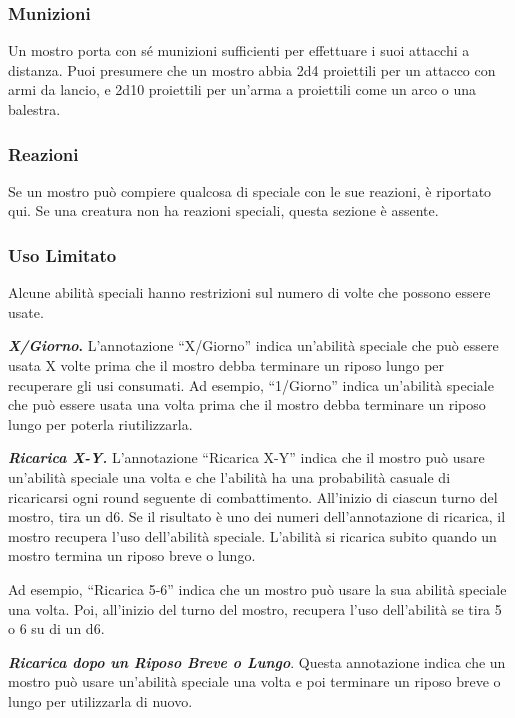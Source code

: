 \begin{multicols}{2}
\subsubsection{Munizioni}

Un mostro porta con sé munizioni sufficienti per effettuare i suoi attacchi a distanza. Puoi presumere che un mostro abbia 2d4 proiettili per un attacco con armi da lancio, e 2d10 proiettili per un'arma a proiettili come un arco o una balestra.

\subsubsection{Reazioni}

Se un mostro può compiere qualcosa di speciale con le sue reazioni, è riportato qui. Se una creatura non ha reazioni speciali, questa sezione è assente.

\subsubsection{Uso Limitato}

Alcune abilità speciali hanno restrizioni sul numero di volte che
possono essere usate.

\textbf{\emph{X/Giorno}.} L'annotazione ``X/Giorno'' indica un'abilità
speciale che può essere usata X volte prima che il mostro debba
terminare un riposo lungo per recuperare gli usi consumati. Ad esempio,
``1/Giorno'' indica un'abilità speciale che può essere usata una volta
prima che il mostro debba terminare un riposo lungo per poterla
riutilizzarla.

\emph{\textbf{Ricarica X-Y.}} L'annotazione ``Ricarica X-Y'' indica che
il mostro può usare un'abilità speciale una volta e che l'abilità ha una
probabilità casuale di ricaricarsi ogni round seguente di combattimento.
All'inizio di ciascun turno del mostro, tira un d6. Se il risultato è
uno dei numeri dell'annotazione di ricarica, il mostro recupera l'uso
dell'abilità speciale. L'abilità si ricarica subito quando un mostro
termina un riposo breve o lungo.

Ad esempio, ``Ricarica 5-6'' indica che un mostro può usare la sua
abilità speciale una volta. Poi, all'inizio del turno del mostro,
recupera l'uso dell'abilità se tira 5 o 6 su di un d6.

\emph{\textbf{Ricarica dopo un Riposo Breve o Lungo}}. Questa
annotazione indica che un mostro può usare un'abilità speciale una volta
e poi terminare un riposo breve o lungo per utilizzarla di nuovo.


\end{multicols}
